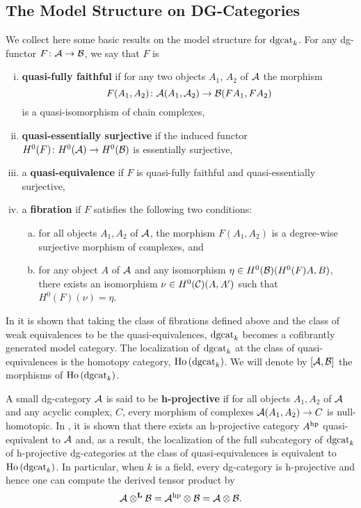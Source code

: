 \documentclass[dissertation.tex]{subfiles}
\begin{document}
\subsection{The Model Structure on DG-Categories}
We collect here some basic results on the model structure for \(\operatorname{dgcat}_k\).
For any dg-functor \(F \colon \mathcal{A} \to \mathcal{B}\), we say that \(F\) is
\begin{enumerate}[(i)]
\item
  {\bf quasi-fully faithful} if for any two objects \(A_1\), \(A_2\) of \(\mathcal{A}\) the morphism
  \[F(A_1, A_2) \colon \mathcal{A}(A_1, \mathcal{A}_2) \to \mathcal{B}(FA_1, FA_2)\]
  is a quasi-isomorphism of chain complexes,
\item
  {\bf quasi-essentially surjective} if the induced functor \(H^0(F) \colon H^0(\mathcal{A}) \to H^0(\mathcal{B})\) is essentially surjective,
\item
  a {\bf quasi-equivalence} if \(F\) is quasi-fully faithful and quasi-essentially surjective,
\item
  a {\bf fibration} if \(F\) satisfies the following two conditions:
  \begin{enumerate}[(a)]
  \item
    for all objects \(A_1, A_2\) of \(\mathcal{A}\), the morphism \(F(A_1,A_2)\) is a degree-wise surjective morphism of complexes, and
  \item
    for any object \(A\) of \(\mathcal{A}\) and any isomorphism \(\eta \in H^0(\mathcal{B})(H^0(F)A, B)\), there exists an isomorphism \(\nu \in H^0(\mathcal{C})(A,A^\prime)\) such that \(H^0(F)(\nu) = \eta\).
  \end{enumerate}
\end{enumerate}
In \cite{Tab05} it is shown that taking the class of fibrations defined above and the class of weak equivalences to be the quasi-equivalences, \(\operatorname{dgcat}_k\) becomes a cofibrantly generated model category.
The localization of \(\operatorname{dgcat}_k\) at the class of quasi-equivalences is the homotopy category, \(\operatorname{Ho}\left(\operatorname{dgcat}_k\right)\).
We will denote by \([\mathcal{A},\mathcal{B}]\) the morphisms of \(\operatorname{Ho}\left(\operatorname{dgcat}_k\right)\).

A small dg-category \(\mathcal{A}\) is said to be {\bf h-projective} if for all objects \(A_1, A_2\) of \(\mathcal{A}\) and any acyclic complex, \(C\), every morphism of complexes \(\mathcal{A}(A_1, A_2) \to C\) is null-homotopic.
In \cite{CS}, it is shown that there exists an h-projective category \(A^{\operatorname{hp}}\) quasi-equivalent to \(\mathcal{A}\) and, as a result, the localization of the full subcategory of \(\operatorname{dgcat}_k\) of h-projective dg-categories at the class of quasi-equivalences is equivalent to \(\operatorname{Ho}\left(\operatorname{dgcat}_k\right)\).
In particular, when \(k\) is a field, every dg-category is h-projective and hence one can compute the derived tensor product by
\[\mathcal{A} \otimes^\mathbf{L} \mathcal{B} = \mathcal{A}^{\operatorname{hp}} \otimes \mathcal{B} = \mathcal{A} \otimes \mathcal{B}.\]
\end{document}
